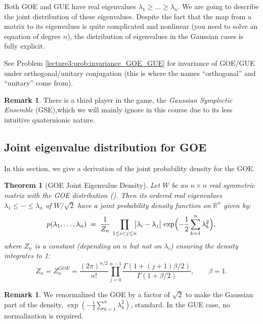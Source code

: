 \documentclass[letterpaper,11pt,oneside,reqno]{book}
\numberwithin{equation}{chapter}  %
\newtheorem{theorem}[proposition]{Theorem}
\theoremstyle{definition}
\newtheorem{remark}[proposition]{Remark}
\begin{document}
Both GOE and GUE have real eigenvalues $\lambda_1 \ge \ldots \ge \lambda_n$.
We are going to describe the joint distribution of these eigenvalues.
Despite the fact that the map from a matrix to its eigenvalues
is quite complicated and nonlinear (you need to solve an equation of degree $n$),
the distribution of eigenvalues in the Gaussian cases is fully explicit.

See Problem \ref{lecture3:prob:invariance_GOE_GUE}
for invariance of GOE/GUE under orthogonal/unitary conjugation
(this is where the names ``orthogonal'' and ``unitary'' come from).

\begin{remark}
	There is a third player in the game, the \emph{Gaussian
	Symplectic Ensemble} (GSE),which we will mainly ignore in
	this course
	due to its less intuitive quaternionic nature.
\end{remark}

\subsection{Joint eigenvalue distribution for GOE}
\label{lecture3:sub:GOE-derivation}

In this section, we give a derivation of the joint probability density for the GOE.

\begin{theorem}[GOE Joint Eigenvalue Density]
\label{lecture3:thm:GOE-joint-eigs-detailed}
Let \(W\) be an \(n\times n\) real symmetric matrix with
the GOE distribution ().
Then its ordered real eigenvalues \(\lambda_1 \le \cdots \le
\lambda_n\)
of $W/\sqrt 2$
have a joint probability density function
on $\mathbb{R}^n$
given by:
\[
  p(\lambda_1,\ldots,\lambda_n)
  \;=\;\frac{1}{Z_{n}}
  \,\prod_{1 \le i < j \le n}
  \!\!\bigl|\lambda_i - \lambda_j\bigr|\,
  \exp\Bigl(
    -\frac{1}{2}\sum_{k=1}^n \lambda_k^2
  \Bigr),
\]
where \(Z_{n}\) is a constant (depending on \(n\) but not on \(\lambda_i\)) ensuring the density integrates to 1:
\begin{equation*}
	Z_n=Z_n^{GOE}=\frac{(2\pi)^{n/2}}{n!}
	\prod_{j=0}^{n-1}\frac{\Gamma(1+(j+1)\beta/2)}{\Gamma(1+\beta/2)}, \qquad
	\beta=1.
\end{equation*}
\end{theorem}
\begin{remark}
	We renormalized the GOE by a factor of $\sqrt 2$ to make the
	Gaussian part of the density, $\exp(-\frac{1}{2}\sum_{k=1}^n \lambda_k^2)$,
	standard. In the GUE case, no normalization is required.
\end{remark}
\end{document}
